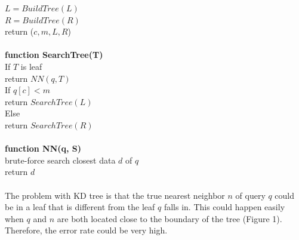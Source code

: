 \documentclass[paper=letter, fontsize=12pt]{article} %
\begin{document}
\hspace*{2em} $L = BuildTree(L)$\\
\hspace*{2em} $R = BuildTree(R)$\\
\hspace*{2em} return ($c, m, L, R$)\\~\\
\hspace*{1em} \textbf{function SearchTree(T)}\\
\hspace*{2em} If $T$ is leaf\\
\hspace*{3em} return $NN(q, T)$\\
\hspace*{2em} If $q[c] < m$\\
\hspace*{3em} return $SearchTree(L)$\\
\hspace*{2em} Else\\
\hspace*{3em} return $SearchTree(R)$\\~\\
\hspace*{1em} \textbf{function NN(q, S)}\\
\hspace*{2em} brute-force search closest data $d$ of $q$\\
\hspace*{2em} return $d$
\\~\\
\hspace*{2em} The problem with KD tree is that the true nearest neighbor $n$ of query $q$ could be in a leaf that is different from the leaf $q$ falls in. This could happen easily when $q$ and $n$ are both located close to the boundary of the tree (Figure 1). Therefore, the error rate could be very high.
\end{document}
